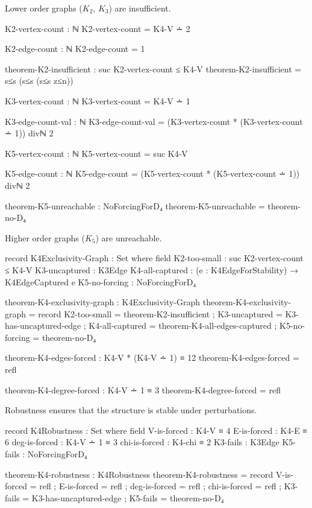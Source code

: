 \documentclass[11pt,a4paper]{book}
\begin{document}
Lower order graphs ($K_2$, $K_3$) are insufficient.

\begin{code}
K2-vertex-count : ℕ
K2-vertex-count = K4-V ∸ 2

K2-edge-count : ℕ
K2-edge-count = 1

theorem-K2-insufficient : suc K2-vertex-count ≤ K4-V
theorem-K2-insufficient = s≤s (s≤s (s≤s z≤n))

K3-vertex-count : ℕ
K3-vertex-count = K4-V ∸ 1

K3-edge-count-val : ℕ
K3-edge-count-val = (K3-vertex-count * (K3-vertex-count ∸ 1)) divℕ 2

K5-vertex-count : ℕ
K5-vertex-count = suc K4-V

K5-edge-count : ℕ
K5-edge-count = (K5-vertex-count * (K5-vertex-count ∸ 1)) divℕ 2

theorem-K5-unreachable : NoForcingForD₄
theorem-K5-unreachable = theorem-no-D₄
\end{code}

Higher order graphs ($K_5$) are unreachable.

\begin{code}
record K4Exclusivity-Graph : Set where
  field
    K2-too-small    : suc K2-vertex-count ≤ K4-V
    K3-uncaptured   : K3Edge
    K4-all-captured : (e : K4EdgeForStability) → K4EdgeCaptured e
    K5-no-forcing   : NoForcingForD₄

theorem-K4-exclusivity-graph : K4Exclusivity-Graph
theorem-K4-exclusivity-graph = record
  { K2-too-small    = theorem-K2-insufficient
  ; K3-uncaptured   = K3-has-uncaptured-edge
  ; K4-all-captured = theorem-K4-all-edges-captured
  ; K5-no-forcing   = theorem-no-D₄
  }

\end{code}

\begin{code}
theorem-K4-edges-forced : K4-V * (K4-V ∸ 1) ≡ 12
theorem-K4-edges-forced = refl

theorem-K4-degree-forced : K4-V ∸ 1 ≡ 3
theorem-K4-degree-forced = refl
\end{code}

Robustness ensures that the structure is stable under perturbations.

\begin{code}
record K4Robustness : Set where
  field
    V-is-forced       : K4-V ≡ 4
    E-is-forced       : K4-E ≡ 6
    deg-is-forced     : K4-V ∸ 1 ≡ 3
    chi-is-forced     : K4-chi ≡ 2
    K3-fails          : K3Edge
    K5-fails          : NoForcingForD₄

theorem-K4-robustness : K4Robustness
theorem-K4-robustness = record
  { V-is-forced   = refl
  ; E-is-forced   = refl
  ; deg-is-forced = refl
  ; chi-is-forced = refl
  ; K3-fails      = K3-has-uncaptured-edge
  ; K5-fails      = theorem-no-D₄
  }
\end{code}
\end{document}
